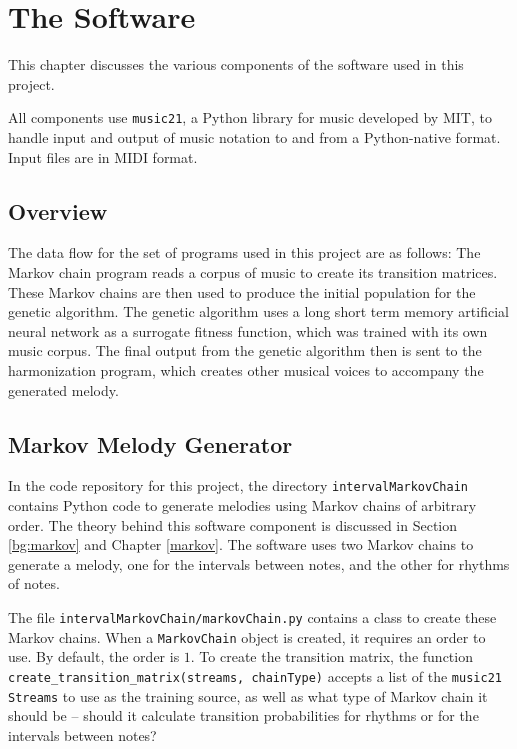 \chapter{The Software} \label{software}


This chapter discusses the various components of the software used in this project.

All components use \texttt{music21}, a Python library for music developed by MIT, to handle input and output of music notation to and from a Python-native format.
Input files are in MIDI format.

\section{Overview} \label{software:overview}

The data flow for the set of programs used in this project are as follows:
The Markov chain program reads a corpus of music to create its transition matrices.
These Markov chains are then used to produce the initial population for the genetic algorithm.
The genetic algorithm uses a long short term memory artificial neural network as a surrogate fitness function, which was trained with its own music corpus.
The final output from the genetic algorithm then is sent to the harmonization program, which creates other musical voices to accompany the generated melody.


\section{Markov Melody Generator} \label{software:markov}

In the code repository for this project, the directory \texttt{intervalMarkovChain} contains Python code to generate melodies using Markov chains of arbitrary order.
The theory behind this software component is discussed in Section \ref{bg:markov} and Chapter \ref{markov}.
The software uses two Markov chains to generate a melody, one for the intervals between notes, and the other for rhythms of notes.

The file \texttt{intervalMarkovChain/markovChain.py} contains a class to create these Markov chains.
When a \texttt{MarkovChain} object is created, it requires an order to use.
By default, the order is $1$.
To create the transition matrix, the function \texttt{create\_transition\_matrix(streams, chainType)} accepts a list of the \texttt{music21} \texttt{Streams} to use as the training source, as well as what type of Markov chain it should be -- should it calculate transition probabilities for rhythms or for the intervals between notes?

